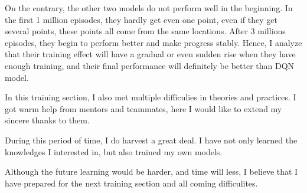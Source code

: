\documentclass[10pt,twocolumn,letterpaper]{article}
\begin{document}
On the contrary, the other two models do not perform well in the beginning. In the first 1 million episodes, they hardly get even one point, even if they get several points, these points all come from the same locations. After 3 millions episodes, they begin to perform better and make progress stably. Hence, I analyze that their training effect will have a gradual or even sudden rise when they have enough training, and their final performance will definitely be better than DQN model.

In this training section, I also met multiple difficulies in theories and practices. I got warm help from mentors and teammates, here I would like to extend my sincere thanks to them.

During this period of time, I do harvest a great deal. I have not only learned the knowledges I interested in, but also trained my own models.

Although the future learning would be harder, and time will less, I believe that I have prepared for the next training section and all coming difficulites.
{\small
\nocite{*}


}
\end{document}
